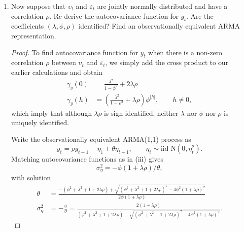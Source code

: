 \documentclass[oneside,reqno]{amsart}
\newcommand{\eps}{\varepsilon}
\newcommand{\ups}{\upsilon}
\newcommand{\N}{\mathrm N}
\theoremstyle{definition}
\begin{document}
\begin{enumerate}
\begin{proof}
\begin{align*}
	-\phi(1 + 2 \theta\phi + \theta^2 ) &= \theta - \theta \phi^2 + \theta \lambda^2
\end{align*}
or 
\[
	\phi \theta^2 + \theta(\phi^2 + \lambda^2 + 1) + \phi = 0
\]
This quadratic equation in $\theta$ has two solutions given by
\[
	\theta = \frac{-(\phi^2 + \lambda^2 + 1) \pm \sqrt{(\phi^2 + \lambda^2 + 1)^2 - 4 \phi^2}}{2 \phi}
\]
To obtain a single solution, we can require that the ARMA(1,1) process is invertible (i.e., $|\theta| < 1$): 
\begin{align*}
	\theta &= \frac{-(\phi^2 + \lambda^2 + 1) + \sqrt{(\phi^2 + \lambda^2 + 1)^2 - 4 \phi^2}}{2 \phi} \\
	\sigma_\eta^2 &= -\frac{\phi}{\theta} = \frac{2}{(\phi^2 + \lambda^2 + 1) - \sqrt{(\phi^2 + \lambda^2 + 1) - 4 \phi^2}}.
\end{align*}
\end{proof}


\item
Now suppose that $\ups_t$ and $\eps_t$ are jointly normally distributed and have a correlation $\rho$. Re-derive the autocovariance function for $y_t$. Are the coefficients $(\lambda, \phi, \rho)$ identified? Find an observationally equivalent ARMA representation.

\begin{proof}
To find autocovariance function for $y_t$ when there is a non-zero correlation $\rho$ between $\ups_t$ and $\eps_t$, we simply add the cross product to our earlier calculations and obtain 
\begin{align*}
	\gamma_y(0) &= \frac{\lambda^2}{1-\phi^2} + 2 \lambda \rho \\
	\gamma_y(h) &=  \left(\frac{\lambda^2}{1-\rho^2} + \lambda \rho \right)\phi^{|h|} , \qquad h \neq 0,
\end{align*}
which imply that although $\lambda \rho$ is sign-identified, neither $\lambda$ nor $\phi$ nor $\rho$ is uniquely identified. 
\par
Write the observationally equivalent ARMA(1,1) process as
\[
	y_t = \rho y_{t-1} -\eta_1 + \theta \eta_{t-1},
	\qquad \eta_t \sim \text{iid } \N(0, \eta_t^2).
\]
Matching autocovariance functions as in (iii) gives
\[
	\sigma_\eta^2 = - \phi(1 + \lambda \rho)/\theta,
\]
with solution 
\begin{align*}
	\theta &= \frac{-(\phi^2 + \lambda^2 + 1 + 2 \lambda \rho) + \sqrt{(\phi^2 + \lambda^2 + 1 + 2 \lambda \rho)^2 - 4 \phi^2 (1 + \lambda \rho)^2}}{2 \phi (1 + \lambda \rho)} \\
	\sigma_\eta^2 &= -\frac{\phi}{\theta} = \frac{2 (1 + \lambda \rho)}{(\phi^2 + \lambda^2 + 1 + 2 \lambda \rho) - \sqrt{(\phi^2 + \lambda^2 + 1 + 2 \lambda \rho)^2 - 4 \phi^2 (1 + \lambda \rho)^2}}.
\end{align*}
\end{proof}


\end{enumerate}
\end{document}

